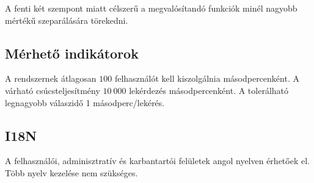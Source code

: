 A fenti két szempont miatt célszerű a megvalósítandó funkciók minél nagyobb mértékű szeparálására törekedni.


\subsection{Mérhető indikátorok}
A rendszernek átlagosan $100$ felhasználót kell kiszolgálnia másodpercenként. A várható csúcsteljesítmény $10~000$ lekérdezés másodpercenként. A tolerálható legnagyobb válaszidő 1 másodperc/lekérés.


\subsection{I18N}
A felhasználói, adminisztratív és karbantartói felületek angol nyelven érhetőek el. Több nyelv kezelése nem szükséges.
